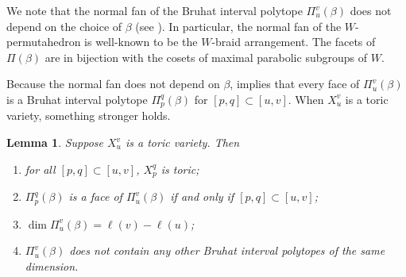 \documentclass[10pt,a4paper]{amsart}
\newtheorem{lemma}[Thm]{Lemma}
\def\pt{\beta}
\begin{document}
We note that the normal fan of the Bruhat interval polytope $\Pi_u^v(\pt)$ does not depend on the choice of $\pt$ (see \cite[Lemma 7.2]{BDLSB}). In particular, the normal fan of the $W$-permutahedron is well-known to be the $W$-braid arrangement. The facets of $\Pi(\pt)$ are in bijection with the cosets of maximal parabolic subgroups of $W$.

Because the normal fan does not depend on $\pt$, \cite[Theorem 7.13]{TW15} implies that every face of $\Pi_u^v(\pt)$ is a Bruhat interval polytope $\Pi_p^q(\pt)$ for $[p, q] \subset [u,v]$. When $X_u^v$ is a toric variety, something stronger holds.


\begin{lemma}\label{lem:toric-BIP-facts}
	Suppose $X_u^v$ is a toric variety. Then 
	\begin{enumerate}
		\item for all $[p, q] \subset [u,v]$, $X_p^q$ is toric;
		\item $\Pi_p^q(\pt)$ is a face of $\Pi_u^v(\pt)$ if and only if $[p, q] \subset [u,v]$;
		\item $\dim \Pi_u^v(\pt) = \ell(v)-\ell(u)$;
		\item $\Pi_u^v(\pt)$ does not contain any other Bruhat interval polytopes of the same dimension.
	\end{enumerate}
\end{lemma}
\end{document}
